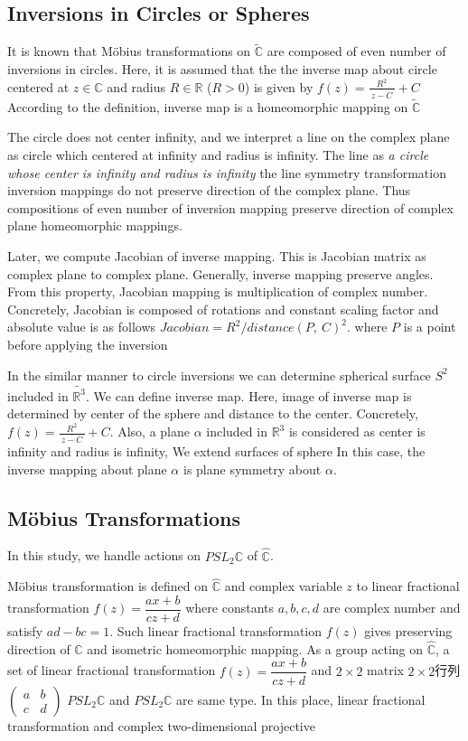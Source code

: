 \subsection{Inversions in Circles or Spheres}

It is known that M\"obius transformations on $\tilde{\mathbb{C}}$
are composed of even number of inversions in circles.
Here, it is assumed that the the inverse map about circle centered at
$z\in\mathbb{C}$ and radius $R\in\mathbb{R}$ ($R>0$)
is given by
$f(z) = \frac{R^2}{~\overline{z -C}~} + C$
According to the definition, inverse map is a homeomorphic mapping on
$\tilde{\mathbb{C}}$

The circle does not center infinity, and we interpret a line on the
complex plane as circle which centered at infinity and radius is
infinity.
The line as \textit{a circle whose center is infinity and radius is
infinity}
the line symmetry transformation
inversion mappings do not preserve direction of the complex plane.
Thus compositions of even number of inversion mapping preserve direction
of complex plane homeomorphic mappings.

Later, we compute Jacobian of inverse mapping.
This is Jacobian matrix as complex plane to complex plane.
Generally, inverse mapping preserve angles.
From this property, Jacobian mapping is multiplication of complex
number.
Concretely, Jacobian is composed of rotations and constant scaling
factor and absolute value is as follows
$Jacobian = R^2 / distance(P,~C)^2$.
where $P$ is a point before applying the inversion

In the similar manner to circle inversions we can determine spherical
surface $S^2$ included in $\tilde{\mathbb{R}^3}$.
We can define inverse map.
Here, image of inverse map is determined by center of the sphere and
distance to the center. Concretely, $f(z) = \frac{R^2}{~\overline{z -C}~} + C$.
Also, a plane $\alpha$ included in $\mathbb{R}^3$ is considered as
center is infinity and radius is infinity,
We extend surfaces of sphere
In this case, the inverse mapping about plane $\alpha$ is plane symmetry
about $\alpha$.

\subsection{M\"obius Transformations}

In this study, we handle actions on $PSL_2\mathbb{C}$ of $\hat{\mathbb{C}}$.

M\"obius transformation is defined on $\hat{\mathbb{C}}$ and
complex variable $z$ to linear fractional transformation
$f(z)=\dfrac{ax+b}{cz+d}$ where constants $a, b, c, d$ are complex
number and satisfy $ad - bc = 1$.
Such linear fractional transformation $f(z)$ gives preserving direction of
$\hat{\mathbb{C}}$ and isometric homeomorphic mapping.
As a group acting on $\hat{\mathbb{C}}$, a set of linear fractional
transformation $f(z) = \dfrac{ax + b}{cz + d}$ and $2 \times 2$ matrix
$2\times 2$行列$\begin{pmatrix}a & b \\ c& d \end{pmatrix}$
$PSL_2\mathbb{C}$ and $PSL_2\mathbb{C}$ are same type.
In this place, linear fractional transformation and
complex two-dimensional
projective

